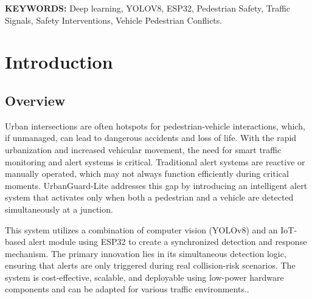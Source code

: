 \documentclass[a4paper, 12pt]{report}
\makeatletter
\let\ps@plainorig\ps@plain
\let\ps@plain\ps@titlepagelayout
\makeatother
\begin{document}
\textbf{KEYWORDS:} Deep learning, YOLOV8, ESP32, Pedestrian Safety, Traffic Signals, Safety Interventions, Vehicle Pedestrian Conflicts.

\newpage

\tableofcontents
\thispagestyle{titlepagelayout}
\newpage

{
\doublespacing
\listoffigures
\thispagestyle{titlepagelayout}
\newpage
\restoregeometry
\listoftables
\thispagestyle{titlepagelayout}
\newpage
\restoregeometry
}




\setcounter{page}{1}

\makeatletter
\let\ps@plain\ps@plainorig
\makeatother

\pagestyle{plain}

\titlespacing*{\chapter}{0pt}{-30pt}{5pt}
\setlength{\parindent}{32pt}

\chapter{Introduction}

\section{Overview}
Urban intersections are often hotspots for pedestrian-vehicle interactions, which, if unmanaged, can lead to dangerous accidents and loss of life. With the rapid urbanization and increased vehicular movement, the need for smart traffic monitoring and alert systems is critical. Traditional alert systems are reactive or manually operated, which may not always function efficiently during critical moments. UrbanGuard-Lite addresses this gap by introducing an intelligent alert system that activates only when both a pedestrian and a vehicle are detected simultaneously at a junction.

This system utilizes a combination of computer vision (YOLOv8) and an IoT-based alert module using ESP32 to create a synchronized detection and response mechanism. The primary innovation lies in its simultaneous detection logic, ensuring that alerts are only triggered during real collision-risk scenarios. The system is cost-effective, scalable, and deployable using low-power hardware components and can be adapted for various traffic environments..
\end{document}
